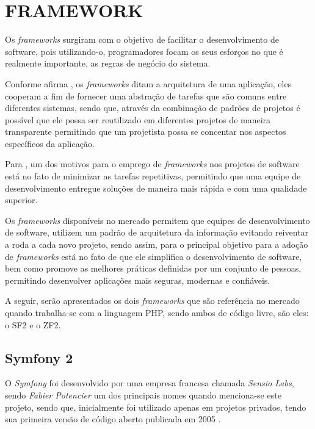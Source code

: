 \section{FRAMEWORK}

Os \textit{frameworks} surgiram com o objetivo de facilitar o desenvolvimento de
software, pois utilizando-o, programadores focam os seus esforços no que é
realmente importante, as regras de negócio do sistema.

Conforme afirma , os
\textit{frameworks} ditam a arquitetura de uma aplicação, eles cooperam a fim de
fornecer uma abstração de tarefas que são comuns entre diferentes sistemas, sendo que,
através da combinação de padrões de projetos é possível que ele possa ser
reutilizado em diferentes projetos de maneira transparente permitindo que um
projetista possa se concentar nos aspectos específicos da aplicação.

Para , um dos motivos para o
emprego de \textit{frameworks} nos projetos de software está no fato de minimizar as
tarefas repetitivas, permitindo que uma equipe de desenvolvimento entregue
soluções de maneira mais rápida e com uma qualidade superior.

Os \textit{frameworks} disponíveis no mercado permitem que equipes de
desenvolvimento de software, utilizem um padrão de arquitetura da informação
evitando reiventar a roda a cada novo projeto, sendo assim, para
 o principal objetivo para
a adoção de \textit{frameworks} está no fato de que ele simplifica o
desenvolvimento de software, bem como promove as melhores práticas definidas por
um conjunto de pessoas, permitindo desenvolver aplicações mais seguras, modernas e
confiáveis.

A seguir, serão apresentados os dois \textit{frameworks} que são referência no
mercado quando trabalha-se com a linguagem \acs{PHP}, sendo ambos de código
livre, são eles: o \ac{SF2} e o \ac{ZF2}.

\subsection{Symfony 2}

O \textit{Symfony} foi desenvolvido por uma empresa francesa chamada
\textit{Sensio Labs}, sendo \textit{Fabier Potencier} um dos principais nomes
quando menciona-se este projeto, sendo que, inicialmente foi utilizado apenas em
projetos privados, tendo sua primeira versão de código aberto publicada em 2005 
\cite{buildingPHPApplicationsWithSymfonyCakePHPAndZendFramework}.

